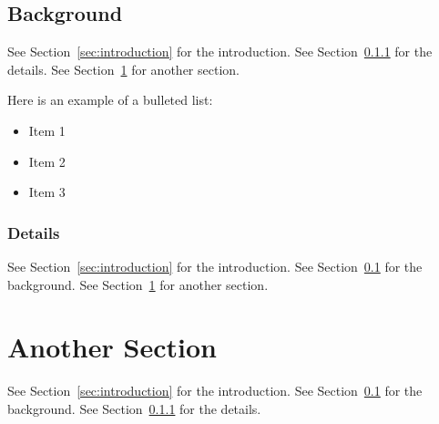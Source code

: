 \documentclass[]{article}
\begin{document}
\subsection{Background}
\label{sec:background}
See Section~\ref{sec:introduction} for the introduction.
See Section~\ref{sec:details} for the details.
See Section~\ref{sec:another-section} for another section.

Here is an example of a bulleted list:
\begin{itemize}
  \item Item 1
  \item Item 2
  \item Item 3
\end{itemize}

\subsubsection{Details}
\label{sec:details}
See Section~\ref{sec:introduction} for the introduction.
See Section~\ref{sec:background} for the background.
See Section~\ref{sec:another-section} for another section.

\section{Another Section}
\label{sec:another-section}
See Section~\ref{sec:introduction} for the introduction.
See Section~\ref{sec:background} for the background.
See Section~\ref{sec:details} for the details.

\newpage
\printbibliography
\end{document}
